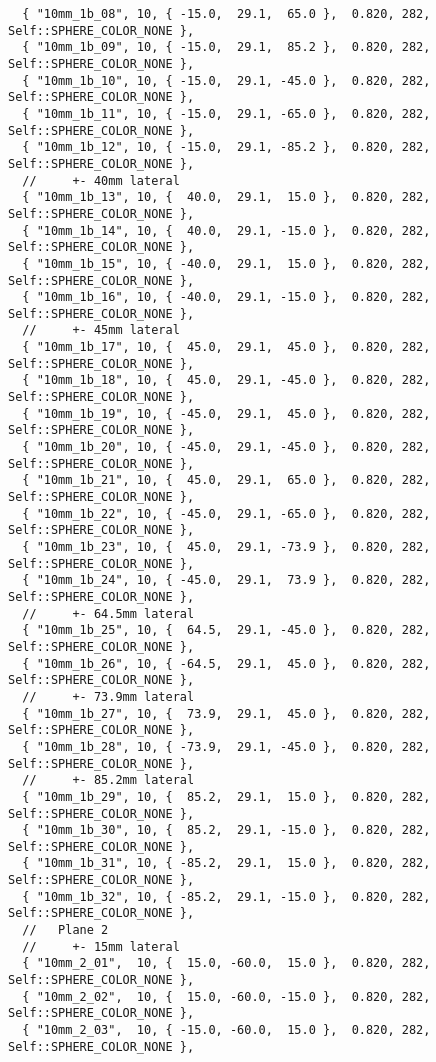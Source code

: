 \documentclass{InsightArticle}
\begin{document}
{\begin{verbatim}
  { "10mm_1b_08", 10, { -15.0,  29.1,  65.0 },  0.820, 282, Self::SPHERE_COLOR_NONE },
  { "10mm_1b_09", 10, { -15.0,  29.1,  85.2 },  0.820, 282, Self::SPHERE_COLOR_NONE },
  { "10mm_1b_10", 10, { -15.0,  29.1, -45.0 },  0.820, 282, Self::SPHERE_COLOR_NONE },
  { "10mm_1b_11", 10, { -15.0,  29.1, -65.0 },  0.820, 282, Self::SPHERE_COLOR_NONE },
  { "10mm_1b_12", 10, { -15.0,  29.1, -85.2 },  0.820, 282, Self::SPHERE_COLOR_NONE },
  //     +- 40mm lateral
  { "10mm_1b_13", 10, {  40.0,  29.1,  15.0 },  0.820, 282, Self::SPHERE_COLOR_NONE },
  { "10mm_1b_14", 10, {  40.0,  29.1, -15.0 },  0.820, 282, Self::SPHERE_COLOR_NONE },
  { "10mm_1b_15", 10, { -40.0,  29.1,  15.0 },  0.820, 282, Self::SPHERE_COLOR_NONE },
  { "10mm_1b_16", 10, { -40.0,  29.1, -15.0 },  0.820, 282, Self::SPHERE_COLOR_NONE },
  //     +- 45mm lateral
  { "10mm_1b_17", 10, {  45.0,  29.1,  45.0 },  0.820, 282, Self::SPHERE_COLOR_NONE },
  { "10mm_1b_18", 10, {  45.0,  29.1, -45.0 },  0.820, 282, Self::SPHERE_COLOR_NONE },
  { "10mm_1b_19", 10, { -45.0,  29.1,  45.0 },  0.820, 282, Self::SPHERE_COLOR_NONE },
  { "10mm_1b_20", 10, { -45.0,  29.1, -45.0 },  0.820, 282, Self::SPHERE_COLOR_NONE },
  { "10mm_1b_21", 10, {  45.0,  29.1,  65.0 },  0.820, 282, Self::SPHERE_COLOR_NONE },
  { "10mm_1b_22", 10, { -45.0,  29.1, -65.0 },  0.820, 282, Self::SPHERE_COLOR_NONE },
  { "10mm_1b_23", 10, {  45.0,  29.1, -73.9 },  0.820, 282, Self::SPHERE_COLOR_NONE },
  { "10mm_1b_24", 10, { -45.0,  29.1,  73.9 },  0.820, 282, Self::SPHERE_COLOR_NONE },
  //     +- 64.5mm lateral
  { "10mm_1b_25", 10, {  64.5,  29.1, -45.0 },  0.820, 282, Self::SPHERE_COLOR_NONE },
  { "10mm_1b_26", 10, { -64.5,  29.1,  45.0 },  0.820, 282, Self::SPHERE_COLOR_NONE },
  //     +- 73.9mm lateral
  { "10mm_1b_27", 10, {  73.9,  29.1,  45.0 },  0.820, 282, Self::SPHERE_COLOR_NONE },
  { "10mm_1b_28", 10, { -73.9,  29.1, -45.0 },  0.820, 282, Self::SPHERE_COLOR_NONE },
  //     +- 85.2mm lateral
  { "10mm_1b_29", 10, {  85.2,  29.1,  15.0 },  0.820, 282, Self::SPHERE_COLOR_NONE },
  { "10mm_1b_30", 10, {  85.2,  29.1, -15.0 },  0.820, 282, Self::SPHERE_COLOR_NONE },
  { "10mm_1b_31", 10, { -85.2,  29.1,  15.0 },  0.820, 282, Self::SPHERE_COLOR_NONE },
  { "10mm_1b_32", 10, { -85.2,  29.1, -15.0 },  0.820, 282, Self::SPHERE_COLOR_NONE },
  //   Plane 2
  //     +- 15mm lateral
  { "10mm_2_01",  10, {  15.0, -60.0,  15.0 },  0.820, 282, Self::SPHERE_COLOR_NONE },
  { "10mm_2_02",  10, {  15.0, -60.0, -15.0 },  0.820, 282, Self::SPHERE_COLOR_NONE },
  { "10mm_2_03",  10, { -15.0, -60.0,  15.0 },  0.820, 282, Self::SPHERE_COLOR_NONE },

\end{verbatim}}
\end{document}
